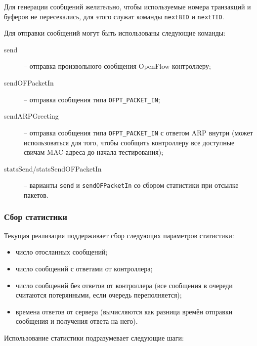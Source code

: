 \documentclass[9pt,a4paper]{article}
\begin{document}
Для генерации сообщений желательно, чтобы используемые номера транзакций и
буферов не пересекались, для этого служат команды \lstinline!nextBID! и
\lstinline!nextTID!.

Для отправки сообщений могут быть использованы следующие команды:

\begin{description}

  \item[send] -- отправка произвольного сообщения OpenFlow контроллеру;

  \item[sendOFPacketIn] -- отправка сообщения типа \lstinline!OFPT_PACKET_IN!;

  \item[sendARPGreeting] -- отправка сообщения типа \lstinline!OFPT_PACKET_IN!
    с ответом ARP внутри (может использоваться для того, чтобы сообщить
    контроллеру все доступные свичам MAC-адреса до начала тестирования);

  \item[statsSend/statsSendOFPacketIn] -- варианты \lstinline!send! и
    \lstinline!sendOFPacketIn! со сбором статистики при отсылке пакетов.

\end{description}

\subsubsection{Сбор статистики}

Текущая реализация поддерживает сбор следующих параметров статистики:

\begin{itemize}
  \item число отосланных сообщений;
  \item число сообщений с ответами от контроллера;
  \item число сообщений без ответов от контроллера (все сообщения в очереди
    считаются потерянными, если очередь переполняется);
  \item времена ответов от сервера (вычисляются как разница времён отправки
    сообщения и получения ответа на него).
\end{itemize}

Использование статистики подразумевает следующие шаги:
\end{document}
